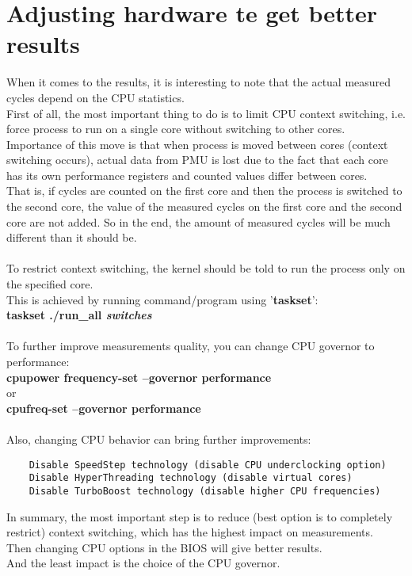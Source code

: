 \documentclass[11pt,onecolumn]{article}
\begin{document}
\newpage
\section{Adjusting hardware te get better results}

When it comes to the results, it is interesting to note that the actual measured cycles depend on the CPU statistics.\\
First of all, the most important thing to do is to limit CPU context switching, i.e. force process to run on a single core without switching to other cores.\\
Importance of this move is that when process is moved between cores (context switching occurs), actual data from PMU is lost due to the fact that each core has its own performance registers and counted values differ between cores.\\
That is, if cycles are counted on the first core and then the process is switched to the second core, the value of the measured cycles on the first core and the second core are not added. So in the end, the amount of measured cycles will be much different than it should be.\\\\
To restrict context switching, the kernel should be told to run the process only on the specified core.\\
This is achieved by running command/program using '\textbf{taskset}':\\
\textbf{taskset ./run\_all \textit{switches}}\\\\
To further improve measurements quality, you can change CPU governor to performance:\\
\textbf{cpupower frequency-set --governor performance}\\
or\\
\textbf{cpufreq-set --governor performance}\\\\
Also, changing CPU behavior can bring further improvements:
\begin{verbatim}
	Disable SpeedStep technology (disable CPU underclocking option)
	Disable HyperThreading technology (disable virtual cores)
	Disable TurboBoost technology (disable higher CPU frequencies)
\end{verbatim}
In summary, the most important step is to reduce (best option is to completely restrict) context switching, which has the highest impact on measurements.\\
Then changing CPU options in the BIOS will give better results.\\
And the least impact is the choice of the CPU governor.
\end{document}

